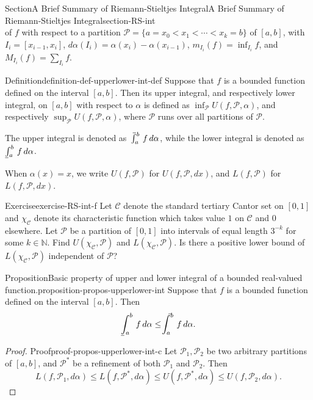 \documentclass[oneside,10pt,]{article}
\makeatletter
\numberwithin{equation}{section}
\newcommand{\bbN}{\mathbb{N}}
\newcommand{\cC}{\mathcal{C}}
\newcommand{\cP}{\mathcal{P}}
\def\upint{\mathchoice
    {\mkern10mu\overline{\vphantom{\intop}\mkern7mu}\mkern-24mu}
    {\mkern7mu\overline{\vphantom{\intop}\mkern7mu}\mkern-14mu}
    {\mkern7mu\overline{\vphantom{\intop}\mkern7mu}\mkern-14mu}
    {\mkern7mu\overline{\vphantom{\intop}\mkern7mu}\mkern-14mu}
  \int}
\def\lowint{\relax\if@display
 \mkern3mu\underline{\vphantom{\intop}\mkern7mu}\mkern-10mu\int
\else 
\underline{\vphantom{\int}\mkern7mu}\mkern-10mu\int
\fi}
\makeatother
\begin{document}
\begin{sectionptx}{Section}{A Brief Summary of Riemann-Stieltjes Integral}{}{A Brief Summary of Riemann-Stieltjes Integral}{}{}{section-RS-int}
\begin{equation*}
\end{equation*}
of \(f\) with respect to a partition \(\cP=\{a=x_{0} < x_{1} < \cdots < x_{k}=b\}\) of \([a, b]\), with \(I_{i}=[x_{i-1}, x_{i}]\), \(d\alpha (I_{i})=\alpha(x_{i})-\alpha(x_{i-1})\), \(m_{I_{i}} (f)=\inf_{I_{i}}f\), and \(M_{I_{i}} (f) =\sum_{I_{i}}f\).%
\begin{definition}{Definition}{}{definition-def-upperlower-int-def}%
%
\label{notation-def-upperlower-int-def-b}%
Suppose that \(f\) is a bounded function defined on the interval \([a, b]\). Then its upper integral, and respectively lower integral, on \([a, b]\)  with respect to \(\alpha\) is defined as \(\inf_{\cP}U(f, \cP, \alpha)\), and respectively \(\sup_{\cP}U(f, \cP, \alpha)\), where \(\cP\) runs over all partitions of \(\cP\).%
\par
The upper integral is denoted as \(\upint_{a}^{b}\,f\, d\alpha\), while the lower integral is denoted as \(\lowint_{a}^{b}\,f\, d\alpha\).%
\end{definition}
When \(\alpha(x)=x\), we write \(U(f, \cP)\) for \(U(f, \cP, dx)\), and \(L(f, \cP)\) for \(L(f, \cP, dx)\).%
\begin{inlineexercise}{Exercise}{}{exercise-RS-int-f}%
Let \(\cC\) denote the standard tertiary Cantor set on \([0, 1]\) and \(\chi_{\cC}\) denote its characteristic function which takes  value \(1\) on \(\cC\) and \(0\) elsewhere. Let \(\cP\) be a partition of \([0, 1]\) into intervals of equal length \(3^{-k}\) for some \(k\in \bbN\). Find \(U(\chi_{\cC}, \cP)\) and \(L(\chi_{\cC}, \cP)\). Is there a positive lower bound of \(L(\chi_{\cC}, \cP)\) independent of \(\cP\)?%
\end{inlineexercise}%
\begin{proposition}{Proposition}{Basic property of upper and lower integral of a bounded real-valued function.}{}{proposition-propos-upperlower-int}%
Suppose that \(f\) is a bounded function defined on the interval \([a, b]\). Then%
\begin{equation*}
\lowint_a^b\,f\, d\alpha \le  \upint_a^b\,f\, d\alpha.
\end{equation*}
\end{proposition}
\begin{proof}{Proof}{}{proof-propos-upperlower-int-c}
Let \(\cP_{1}, \cP_{2}\) be two arbitrary partitions of \([a, b]\), and \(\cP^{*}\) be a refinement of both \(\cP_{1}\) and \(\cP_{2}\). Then%
\begin{equation*}
L(f, \cP_{1},d\alpha)\le L(f, \cP^{*}, d \alpha)\le U(f, \cP^{*}, d \alpha)\le U(f, \cP_{2}, d \alpha).

\end{equation*}
\end{proof}
\end{sectionptx}
\end{document}
